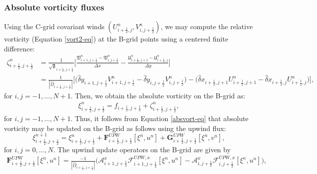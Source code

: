 \subsubsection{Absolute vorticity fluxes}
Using the C-grid covariant winds $(U_{i+\frac{1}{2},j}^n,V_{i,j+\frac{1}{2}}^n)$,
we may compute the relative vorticity (Equation \eqref{vort2-eq}) at the B-grid points using a centered finite difference:
\begin{align}
	\label{2d-sw-rv-Cgrid}
	\zeta_{i+\frac{1}{2},j+\frac{1}{2}}^n &= \frac{1}{\sqrt{\mathfrak{g}}_{i+\frac{1}{2},j+\frac{1}{2}}}\bigg[
	\frac{\mathfrak{V}_{i+1,j+\frac{1}{2}}^n-\mathfrak{V}_{i,j+\frac{1}{2}}^n}{\Delta x} -
	\frac{\mathfrak{U}_{i+\frac{1}{2},j+1}^n-\mathfrak{U}_{i+\frac{1}{2},j}^n}{\Delta y}
\bigg]\nonumber\\
	&= 
    \frac{1}{|\hat{\Omega}_{i+\frac{1}{2},j+\frac{1}{2}}|}\bigg[
         {\big({\hat{\delta}y_{i+1,j+\frac{1}{2}}{V}_{i+1,j+\frac{1}{2}}^n-
    	   \hat{\delta}y_{i  ,j+\frac{1}{2}}{V}_{i  ,j+\frac{1}{2}}^n}\big)} -
         {\big({\hat{\delta}x_{i+\frac{1}{2},j+1}{U}_{i+\frac{1}{2},j+1}^n-
    	   \hat{\delta}x_{i+\frac{1}{2},j  }{U}_{i+\frac{1}{2},j}^n}\big)}
    \bigg],
\end{align}
for $i,j=-1, \ldots, N+1$.
Then, we obtain the absolute vorticity on the B-grid as:
\begin{align}
	\label{2d-sw-av-Cgrid}
	\xi_{i+\frac{1}{2},j+\frac{1}{2}}^n =
	f_{i+\frac{1}{2},j+\frac{1}{2}} +
	\zeta_{i+\frac{1}{2},j+\frac{1}{2}}^n,
\end{align}
for $i,j=-1, \ldots, N+1$.
Thus, it follows from Equation \eqref{absvort-eq} that absolute vorticity may be updated on the B-grid as follows using the upwind flux:
\begin{equation}
	\label{2d-avort-eq-Cgrid}
	\xi^{n+1}_{i+\frac{1}{2},j+\frac{1}{2}}  =
	\xi^{n}_{i+\frac{1}{2},j+\frac{1}{2}} + 
	\mathbf{F}_{i+\frac{1}{2},j+\frac{1}{2}}^{UPW}[{\xi^n,{u}^{n}}]  + 
	\mathbf{G}_{i+\frac{1}{2},j+\frac{1}{2}}^{UPW}[{\xi^n,{v}^{n}}],
\end{equation}
for $i,j=0, \ldots, N$.
The upwind update operators on the B-grid are given by
\begin{align}
	\mathbf{F}_{i+\frac{1}{2},j+\frac{1}{2}}^{UPW}[{\xi^n,u^{n}}] = 
	\frac{-1}{|\hat{\Omega}_{i+\frac{1}{2},j+\frac{1}{2}}|}
	\bigg(\mathcal{A}_{i+1,j+\frac{1}{2}}^{x} \mathcal{F}_{i+1,j+\frac{1}{2}}^{UPW,x}[\xi^n,{u}^{n}]-
          \mathcal{A}_{i  ,j+\frac{1}{2}}^{x} \mathcal{F}_{i  ,j+\frac{1}{2}}^{UPW,x}[\xi^n,{u}^{n}] \bigg),
\end{align}
